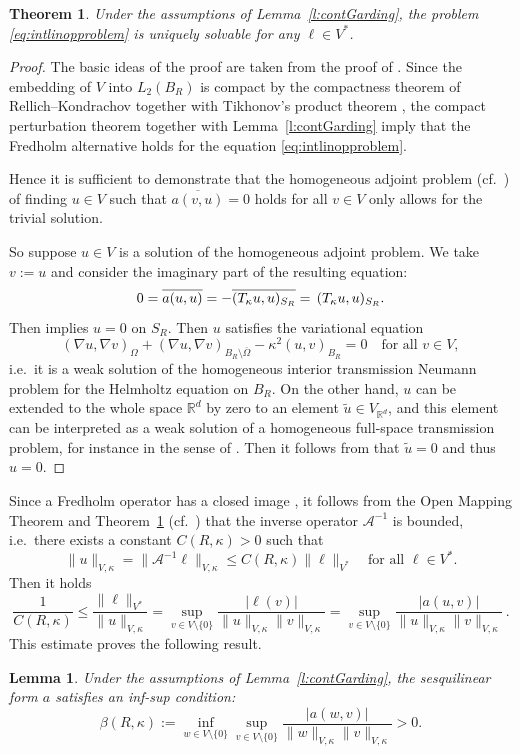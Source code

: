 \documentclass[12pt,DIV=14]{scrartcl}
\newtheorem{lemma}[definition]{Lemma}
\newtheorem{theorem}[definition]{Theorem}
\providecommand{\R}{\mathbb{R}}
\let\Im\relax\DeclareMathOperator{\Im}{Im}
\providecommand{\Om}{\Omega}
\begin{document}
\begin{theorem}\label{th:linprobsolvable}
Under the assumptions of Lemma~\ref{l:contGarding},
the problem \eqref{eq:intlinopproblem} is uniquely solvable for any $\ell\in V^\ast$.
\end{theorem}
\begin{proof}
The basic ideas of the proof are taken from the proof of \cite[Thm~3.8]{Melenk:10}.
Since the embedding of $V$ into $L_2(B_R)$ is compact by
the compactness theorem of Rellich–Kondrachov \cite[Thm.~3.27]{McLean:00}
together with Tikhonov's product theorem \cite[Thm.~4.1]{Kelley:63},
the compact perturbation theorem \cite[Thm.~2.34]{McLean:00}
together with Lemma~\ref{l:contGarding} imply that
the Fredholm alternative \cite[Thm.~2.27]{McLean:00} holds for the equation \eqref{eq:intlinopproblem}.

Hence it is sufficient to demonstrate that the homogeneous adjoint problem
(cf.\ \cite[p.~43]{McLean:00})
of finding $u\in V$ such that $\overline{a(v,u)} = 0$ holds for all $v\in V$
only allows for the trivial solution.

So suppose $u\in V$ is a solution of the homogeneous adjoint problem.
We take $v:=u$ and consider the imaginary part of the resulting equation:
\[
0 = \Im\overline{a(u,u)}
= - \Im\overline{(T_\kappa u,u)_{S_R}}
= \Im\,(T_\kappa u,u)_{S_R}.
\]
Then \cite[Lemma~3.3]{Melenk:10} implies $u=0$ on $S_R$.
Then $u$ satisfies the variational equation
\[
(\nabla u,\nabla v)_\Om + (\nabla u,\nabla v)_{B_R\setminus\overline\Om}
- \kappa^2(u,v)_{B_R} = 0
\quad\text{for all }
v\in V,
\]
i.e.\ it is a weak solution of the homogeneous interior transmission Neumann problem
for the Helmholtz equation on $B_R$.
On the other hand, $u$ can be extended to the whole space $\R^d$ by zero
to an element $\tilde u\in V_{\R^d}$, and this element can be interpreted
as a weak solution of a homogeneous full-space transmission problem,
for instance in the sense of \cite[Problem (P)]{Torres:93}.
Then it follows from \cite[Lemma~7.1]{Torres:93} that $\tilde u=0$ and thus $u=0$.
\end{proof}

Since a Fredholm operator has a closed image \cite[p.~33]{McLean:00},
it follows from the Open Mapping Theorem and Theorem~\ref{th:linprobsolvable}
(cf.\ \cite[Cor.~2.2]{McLean:00})
that the inverse operator $\mathcal{A}^{-1}$ is bounded,
i.e.\ there exists a constant $C(R,\kappa)>0$ such that
\[
\|u\|_{V,\kappa} = \|\mathcal{A}^{-1}\ell\|_{V,\kappa} \le C(R,\kappa) \|\ell\|_{V^\ast}
\quad\text{for all }
\ell\in V^\ast.
\]
Then it holds
\[
\frac{1}{C(R,\kappa)}\le \frac{\|\ell\|_{V^\ast}}{\|u\|_{V,\kappa}}
=\sup_{v\in V\setminus\{0\}}\frac{|\ell(v)|}{\|u\|_{V,\kappa}\|v\|_{V,\kappa}}
=\sup_{v\in V\setminus\{0\}}\frac{|a(u,v)|}{\|u\|_{V,\kappa}\|v\|_{V,\kappa}}\,.
\]
This estimate proves the following result.
\begin{lemma}\label{l:infsup}
Under the assumptions of Lemma~\ref{l:contGarding}, the sesquilinear form
$a$ satisfies an \emph{inf-sup condition}:
\[
\beta(R,\kappa) := \inf_{w\in V\setminus\{0\}}\sup_{v\in V\setminus\{0\}}
\frac{|a(w,v)|}{\|w\|_{V,\kappa} \|v\|_{V,\kappa}} > 0.
\]
\end{lemma}
\end{document}
